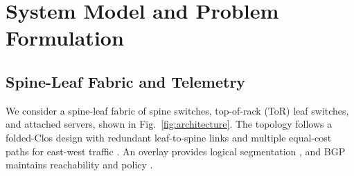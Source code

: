 \documentclass[conference]{IEEEtran}
\begin{document}
\begin{table}[htbp]
\caption{Positioning relative to prior RCA work.}
\label{tab:relatedwork}
\centering
{}
\end{table}

\section{System Model and Problem Formulation}
\label{sec:model}

\subsection{Spine-Leaf Fabric and Telemetry}
We consider a spine-leaf fabric of spine switches, top-of-rack (ToR) leaf switches, and attached servers, shown in Fig.~\ref{fig:architecture}. The topology follows a folded-Clos design with redundant leaf-to-spine links and multiple equal-cost paths for east-west traffic \cite{alfares2008fattree,greenberg2009vl2}. An overlay provides logical segmentation \cite{mahalingam2014vxlan}, and BGP maintains reachability and policy \cite{rekhter2006bgp}.
\end{document}
